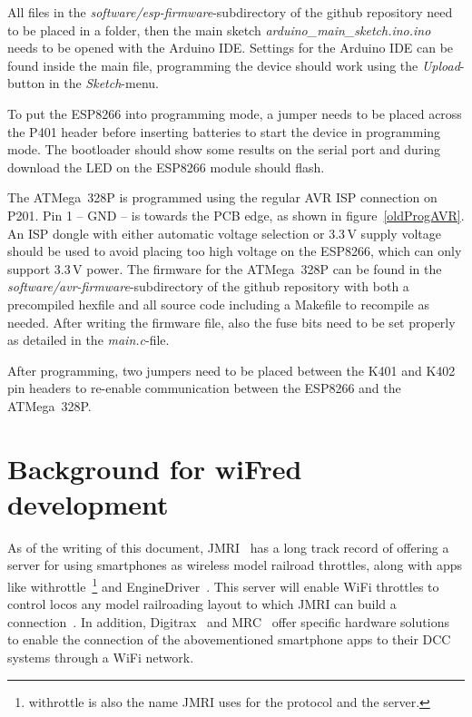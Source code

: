 \documentclass[11pt,a4paper]{scrartcl}
\begin{document}
All files in the \textit{software/esp-firmware}-subdirectory of the github repository need to be placed in a folder, then the main sketch \textit{arduino\_main\_sketch.ino.ino} needs to be opened with the Arduino IDE. Settings for the Arduino IDE can be found inside the main file, programming the device should work using the \textit{Upload}-button in the \textit{Sketch}-menu.

To put the ESP8266 into programming mode, a jumper needs to be placed across the P401 header before inserting batteries to start the device in programming mode. The bootloader should show some results on the serial port and during download the LED on the ESP8266 module should flash.

The ATMega~328P is programmed using the regular AVR ISP connection on P201. Pin 1 -- GND -- is towards the PCB edge, as shown in figure~\ref{oldProgAVR}. An ISP dongle with either automatic voltage selection or 3.3\,V supply voltage should be used to avoid placing too high voltage on the ESP8266, which can only support 3.3\,V power. The firmware for the ATMega~328P can be found in the \textit{software/avr-firmware}-subdirectory of the github repository with both a precompiled hexfile and all source code including a Makefile to recompile as needed. After writing the firmware file, also the fuse bits need to be set properly as detailed in the \textit{main.c}-file.

After programming, two jumpers need to be placed between the K401 and K402 pin headers to re-enable communication between the ESP8266 and the ATMega~328P.

\clearpage

\section{Background for wiFred development} \label{background}

As of the writing of this document, JMRI~\cite{jmri} has a long track record of offering a server for using smartphones as wireless model railroad throttles, along with apps like withrottle~\cite{withrottleApp}\footnote{withrottle is also the name JMRI uses for the protocol and the server.} and EngineDriver~\cite{EngineDriver}. This server will enable WiFi throttles to control locos any model railroading layout to which JMRI can build a connection~\cite{jmrihardwaresupport}. In addition, Digitrax~\cite{digitrax} and MRC~\cite{mrc} offer specific hardware solutions to enable the connection of the abovementioned smartphone apps to their DCC systems through a WiFi network.
\end{document}
